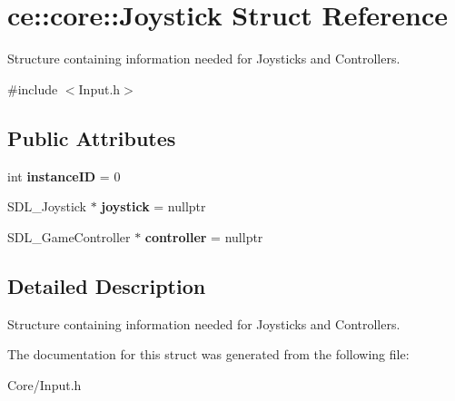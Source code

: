 \hypertarget{structce_1_1core_1_1_joystick}{}\section{ce\+:\+:core\+:\+:Joystick Struct Reference}
\label{structce_1_1core_1_1_joystick}


Structure containing information needed for Joysticks and Controllers.  




{\ttfamily \#include $<$Input.\+h$>$}

\subsection*{Public Attributes}
\begin{DoxyCompactItemize}
\item 
\mbox{\label{structce_1_1core_1_1_joystick_a91d7c9adbb3e74b6e6379e50ff71c7b9}} 
int {\bfseries instance\+ID} = 0
\item 
\mbox{\label{structce_1_1core_1_1_joystick_a7d8e4662b79ba8cf85ada42f146d0cb9}} 
S\+D\+L\+\_\+\+Joystick $\ast$ {\bfseries joystick} = nullptr
\item 
\mbox{\label{structce_1_1core_1_1_joystick_a4becd96a25a7cfc34e53abde7b948810}} 
S\+D\+L\+\_\+\+Game\+Controller $\ast$ {\bfseries controller} = nullptr
\end{DoxyCompactItemize}


\subsection{Detailed Description}
Structure containing information needed for Joysticks and Controllers. 

The documentation for this struct was generated from the following file\+:\begin{DoxyCompactItemize}
\item 
Core/Input.\+h\end{DoxyCompactItemize}
